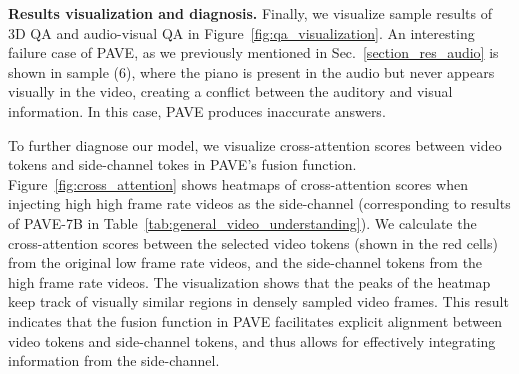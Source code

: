 
\medskip
\noindent\textbf{Results visualization and diagnosis.} 
Finally, we visualize sample results of 3D QA and audio-visual QA in Figure~\ref{fig:qa_visualization}. An interesting failure case of PAVE, as we previously mentioned in Sec.\ \ref{section_res_audio} is shown in sample (6), where the piano is present in the audio but never appears visually in the video, creating a conflict between the auditory and visual information. In this case, PAVE produces inaccurate answers.

To further diagnose our model, we visualize cross-attention scores between video tokens and side-channel tokes in PAVE's fusion function. Figure~\ref{fig:cross_attention} shows  heatmaps of cross-attention scores when injecting high high frame rate videos as the side-channel (corresponding to results of PAVE-7B in Table~\ref{tab:general_video_understanding}). We calculate the cross-attention scores between the selected video tokens (shown in the red cells) from the original low frame rate videos, and the side-channel tokens from the high frame rate videos. The visualization shows that the peaks of the heatmap keep track of visually similar regions in densely sampled video frames. This result indicates that the fusion function in PAVE facilitates explicit alignment between video tokens and side-channel tokens, and thus allows for effectively integrating information from the side-channel.







